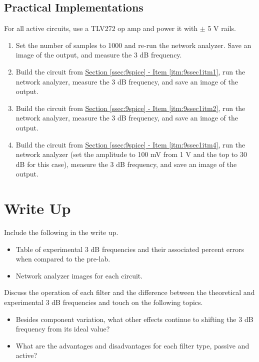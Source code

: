 \subsection{Practical Implementations}

For all active circuits, use a TLV272 op amp and power it with $\pm$ 5 V rails.

\begin{enumerate}
	\item Set the number of samples to 1000 and re-run the network analyzer. Save an image of the output, and measure the 3 dB frequency.
	\item Build the circuit from \hyperref[itm:9ssec1itm1]{Section \ref*{ssec:9spice} - Item \ref*{itm:9ssec1itm1}}, run the network analyzer, measure the 3 dB frequency, and save an image of the output.
	\item Build the circuit from \hyperref[itm:9ssec1itm2]{Section \ref*{ssec:9spice} - Item \ref*{itm:9ssec1itm2}}, run the network analyzer, measure the 3 dB frequency, and save an image of the output.
	\item Build the circuit from \hyperref[itm:9ssec1itm4]{Section \ref*{ssec:9spice} - Item \ref*{itm:9ssec1itm4}}, run the network analyzer (set the amplitude to 100 mV from 1 V and the top to 30 dB for this case), measure the 3 dB frequency, and save an image of the output.
\end{enumerate}

\section{Write Up}

Include the following in the write up.

\begin{itemize}
	\item Table of experimental 3 dB frequencies and their associated percent errors when compared to the pre-lab.
	\item Network analyzer images for each circuit.
\end{itemize}

Discuss the operation of each filter and the difference between the theoretical and experimental 3 dB frequencies and touch on the following topics.

\begin{itemize}
	\item Besides component variation, what other effects continue to shifting the 3 dB frequency from its ideal value?
	\item What are the advantages and disadvantages for each filter type, passive and active?
\end{itemize}

